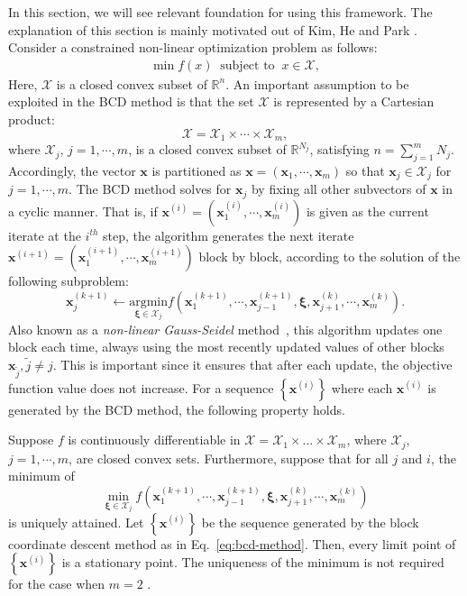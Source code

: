 In this section, we will see relevant foundation for using  this
framework.  The explanation of this section is mainly motivated out of
Kim, He and Park \cite{KHP2014}. Consider a constrained non-linear optimization problem
as follows:
\begin{gather}
\min f(x)\:\mbox{ subject to }\:x \in\mathcal{X},\label{eq:general_nonlinear}
\end{gather}
Here,  $\mathcal{X}$ is a closed convex subset of $\mathbb{R}^{n}$.
An important assumption to be exploited in the BCD method is that
the set $\mathcal{X}$ is represented by a Cartesian product:
\begin{equation}
\mathcal{X}=\mathcal{X}_{1}\times\cdots\times\mathcal{X}_{m},\label{eq:bcd-cartesian-product}
\end{equation}
where $\mathcal{X}_{j}$, $j=1,\cdots,m$, is a closed convex subset
of $\mathbb{R}^{N_{j}}$, satisfying $n=\sum_{j=1}^{m}N_{j}$.
Accordingly, the vector $\mathbf{x}$ is partitioned as
$\mathbf{x}=(\mathbf{x}_{1},\cdots,\mathbf{x}_{m})$ so that
$\mathbf{x}_{j}\in\mathcal{X}_{j}$ for $j=1,\cdots,m$. The BCD
method solves for $\mathbf{x}_{j}$ by fixing all other subvectors of
$\mathbf{x}$ in a cyclic manner. That is, if
$\mathbf{x}^{(i)}=(\mathbf{x}_{1}^{(i)},\cdots,\mathbf{x}_{m}^{(i)})$
is given as the current iterate at the $i^{th}$ step, the algorithm
generates the next iterate
$\mathbf{x}^{(i+1)}=(\mathbf{x}_{1}^{(i+1)},\cdots,\mathbf{x}_{m}^{(i+1)})$
block by block, according to the solution of the following
subproblem:
\begin{equation}
\mathbf{x}_{j}^{(k+1)}\leftarrow\underset{\mathbf{\xi}\in\mathcal{X}_{j}}{\text{argmin}}
f(\mathbf{x}_{1}^{(k+1)},\cdots,\mathbf{x}_{j-1}^{(k+1)},\mathbf{\xi},\mathbf{x}_{j+1}^{(k)},\cdots,\mathbf{x}_{m}^{(k)}).\label{eq:bcd-method}
\end{equation}
Also known as a \textit{non-linear Gauss-Seidel}
method~\cite{Bertsekas1999}, this algorithm updates one block each
time, always using the most recently updated values of other blocks
$\mathbf{x}_{\tilde{j}},\tilde{j}\ne j$. This is important since it
ensures that after each update, the objective function value does
not increase. For a sequence $\left\lbrace
\mathbf{x}^{(i)}\right\rbrace $ where each $\mathbf{x}^{(i)}$ is
generated by the BCD method, the following property holds.
\begin{theorem}
\label{thm:bcd}
Suppose $f$ is continuously differentiable in $\mathcal{X}=\mathcal{X}_{1}\times\dots\times\mathcal{X}_{m}$,
where $\mathcal{X}_{j}$, $j=1,\cdots,m$, are closed convex sets.
Furthermore, suppose that for all $j$ and $i$, the minimum of
\[
\min_{\mathbf{\mathbf{\xi}}\in\mathcal{X}_{j}}f(\mathbf{x}_{1}^{(k+1)},\cdots,\mathbf{x}_{j-1}^{(k+1)},\mathbf{\xi},\mathbf{x}_{j+1}^{(k)},\cdots,\mathbf{x}_{m}^{(k)})
\]
is uniquely attained. Let $\left\lbrace
\mathbf{x}^{(i)}\right\rbrace $ be the sequence generated by the
block coordinate descent method as in Eq.~\eqref{eq:bcd-method}.
Then, every limit point of $\left\lbrace
\mathbf{x}^{(i)}\right\rbrace $ is a stationary point. The
uniqueness of the minimum is not required for the case when  $m=2$
\cite{GS2000}.
\end{theorem}

